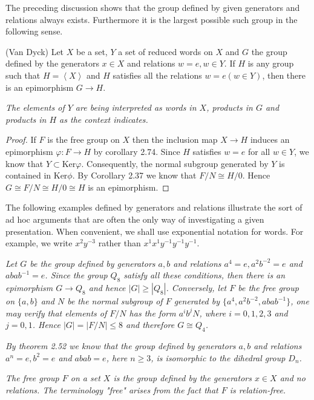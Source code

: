 The preceding discussion shows that the group defined by given generators and relations always exists. Furthermore it is the largest possible such group in the following sense.
\begin{theorem}(Van Dyck)
Let $X$ be a set, $Y$ a set of reduced words on $X$ and $G$ the group defined by the generators $x\in X$ and relations $w=e,w\in Y$. If $H$ is any group such that $H=\left<X\right>$ and $H$ satisfies all the relations $w=e(w\in Y)$, then there is an epimorphism $G\to H$.
\end{theorem}
\begin{note}\em
The elements of $Y$ are being interpreted as words in $X$, products in $G$ and products in $H$ as the context indicates.
\end{note}
\begin{proof}
If $F$ is the free group on $X$ then the inclusion map $X\to H$ induces an epimorphism $\varphi:F\to H$ by corollary 2.74. Since $H$ satisfies $w=e$ for all $w\in Y$, we know that $Y\subset\mathrm{Ker}\varphi$. Consequently, the normal subgroup generated by $Y$ is contained in $\mathrm{Ker}\phi$. By Corollary 2.37 we know that $F/N\cong H/0$. Hence $G\cong F/N\cong H/0\cong H$ is an epimorphism.
\end{proof}
The following examples defined by generators and relations illustrate the sort of ad hoc arguments that are often the only way of investigating a given presentation. When convenient, we shall use exponential notation for words. For example, we write $x^2y^{-3}$ rather than $x^1x^1y^{-1}y^{-1}y^{-1}$.
\begin{example}\em
Let $G$ be the group defined by generators $a,b$ and relations $a^4=e,a^2b^{-2}=e$ and $abab^{-1}=e$. Since the group $Q_8$ satisfy all these conditions, then there is an epimorphism $G\to Q_8$ and hence $|G|\ge|Q_8|$. Conversely, let $F$ be the free group on $\{a,b\}$ and $N$ be the normal subgroup of $F$ generated by $\{a^4,a^2b^{-2},abab^{-1}\}$, one may verify that elements of $F/N$ has the form $a^ib^jN$, where $i=0,1,2,3$ and $j=0,1$. Hence $|G|=|F/N|\le 8$ and therefore $G\cong Q_4$.
\end{example}
\begin{example}\em
By theorem 2.52 we know that the group defined by generators $a,b$ and relations $a^n=e,b^2=e$ and $abab=e$, here $n\ge 3$, is isomorphic to the dihedral group $D_n$.
\end{example}
\begin{example}\em
The free group $F$ on a set $X$ is the group defined by the generators $x\in X$ and no relations. The terminology "free" arises from the fact that $F$ is relation-free.
\end{example}

